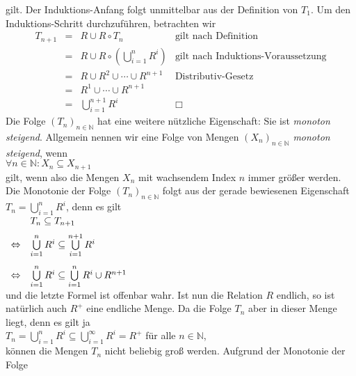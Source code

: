 gilt.  Der Induktions-Anfang folgt unmittelbar aus der Definition von $T_1$.  Um den 
Induktions-Schritt durchzuführen, betrachten wir
\[ \begin{array}{lcll}
   T_{n+1} & = & R \cup R \circ T_n & \mbox{gilt nach Definition} \\[0.2cm]
           & = & R \cup R \circ \left(\bigcup\limits_{i=1}^{n} R^i\right) &
                 \mbox{gilt nach Induktions-Voraussetzung} \\[0.4cm]
           & = & R \cup R^2 \cup \cdots \cup R^{n+1}  &
                 \mbox{Distributiv-Gesetz} \\[0.2cm]
           & = & R^1 \cup \cdots \cup R^{n+1} \\
           & = & \bigcup\limits_{i=1}^{n+1} R^i & \Box 
   \end{array}
\]
Die Folge $(T_n)_{n\in\mathbb{N}}$ hat eine weitere nützliche Eigenschaft: Sie ist 
\emph{monoton steigend}.  Allgemein nennen wir eine Folge von Mengen $(X_n)_{n\in\mathbb{N}}$
\emph{monoton steigend}, wenn 
\\[0.2cm]
\hspace*{1.3cm}
$\forall n \in \mathbb{N}: X_n \subseteq X_{n+1}$
\\[0.2cm]
gilt, wenn also die Mengen $X_n$ mit wachsendem Index $n$ immer größer werden.
Die Monotonie der Folge $(T_n)_{n \in \mathbb{N}}$ folgt aus der gerade bewiesenen Eigenschaft
$T_n = \bigcup_{i=1}^{n} R^i$, denn es gilt
\\[0.2cm]
\hspace*{1.3cm}
$
\begin{array}[t]{llcl}
                & T_n \subseteq T_{n+1} \\[0.2cm]
\Leftrightarrow & \bigcup\limits_{i=1}^{n} R^i \subseteq \bigcup\limits_{i=1}^{n+1} R^i \\[0.5cm]
\Leftrightarrow & \bigcup\limits_{i=1}^{n} R^i \subseteq \bigcup\limits_{i=1}^{n} R^i \cup R^{n+1} \\
\end{array}
$
\\[0.2cm]
und die letzte Formel ist offenbar wahr.  Ist nun die Relation $R$ endlich, so ist natürlich 
auch $R^+$ eine endliche Menge.  Da die 
Folge $T_n$ aber in dieser Menge liegt, denn es gilt ja 
\\[0.2cm]
\hspace*{1.3cm}
$T_n = \bigcup\limits_{i=1}^{n} R^i \subseteq \bigcup\limits_{i=1}^{\infty} R^i = R^+$ \quad für alle $n \in \mathbb{N}$,
\\[0.2cm]
können die Mengen $T_n$ nicht beliebig groß werden.  Aufgrund der Monotonie der Folge

